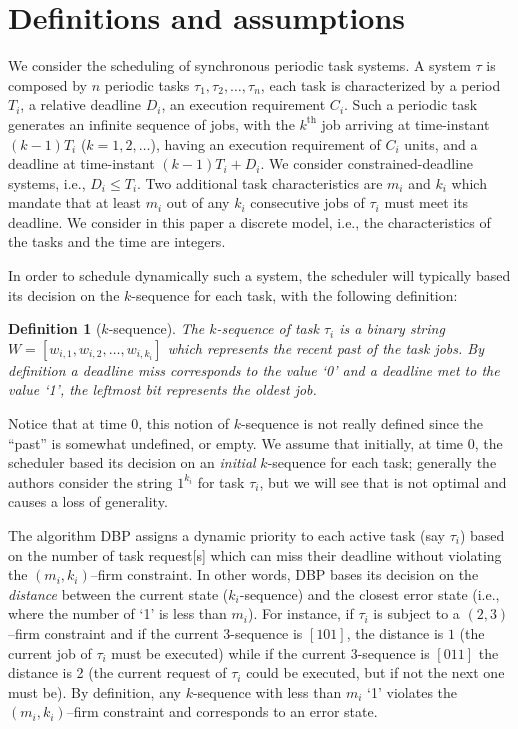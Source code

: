 \documentclass{article}
\newtheorem{Definition}{Definition}
\begin{document}
\section{Definitions and assumptions}\label{sec:model}

We consider the scheduling of synchronous periodic task systems. A
system $\tau$ is composed by $n$ periodic tasks $\tau_1,
\tau_2, \ldots, \tau_n$, each task is characterized by a
period $T_i$, a relative deadline $D_i$, an execution requirement 
$C_i$. Such a periodic task generates an
infinite sequence of jobs, with the $k^{\text{th}}$ job
arriving at time-instant $(k - 1)T_i$ ($k = 1, 2,
\ldots$), having an execution requirement of $C_{i}$ units,
and a deadline at time-instant $(k-1)T_{i}+
D_{i}.$ We consider constrained-deadline systems, i.e., $D_{i} \leq T_{i}$. Two additional task characteristics are $m_{i}$ and $k_{i}$ which mandate that at least $m_{i}$ out of any $k_{i}$ consecutive jobs of $\tau_{i}$ must meet its deadline. We consider in this paper a discrete model, i.e., the characteristics of the tasks and the time are integers. 

In order to schedule dynamically such a system, the scheduler will typically based its decision on the $k$-sequence for each task, with the following definition:

\begin{Definition}[$k$-sequence]\label{def:kseq}
The $k$-sequence of task $\tau_{i}$ is a binary string $W = [w_{i,1}, w_{i,2}, \ldots, w_{i,k_{i}}]$ which represents the recent past of the task jobs. By definition a deadline miss corresponds to the value `0' and a deadline met to the value `1', the leftmost bit represents the oldest job.
\end{Definition}

Notice that at time 0, this notion of $k$-sequence is not really defined since the ``past'' is somewhat  undefined, or empty. We assume that initially, at time 0, the scheduler based its decision on an \emph{initial} $k$-sequence for each task; generally the authors consider the string $1^{k_{i}}$ for task $\tau_{i}$, but we will see that is not optimal and causes a loss of generality.

The algorithm DBP assigns a dynamic priority to each active task (say $\tau_{i}$) based on the number of task request[s] which can miss their deadline without violating the $(m_{i},k_{i})$--firm constraint. In other words, DBP bases its decision on the \emph{distance} between the current state ($k_{i}$-sequence) and the closest error state (i.e., where the number of `1' is less than $m_{i}$). For instance, if $\tau_{i}$ is subject to a $(2,3)$--firm constraint and if the current $3$-sequence is $[101]$, the distance is $1$ (the current job of $\tau_{i}$ must be executed) while if the current $3$-sequence is $[011]$ the distance is 2 (the current request of $\tau_{i}$ could be executed, but if not the next one must be). By definition, any $k$-sequence with less than $m_{i}$ `1' violates the $(m_{i}, k_{i})$--firm constraint and corresponds to an error state.
\end{document}
